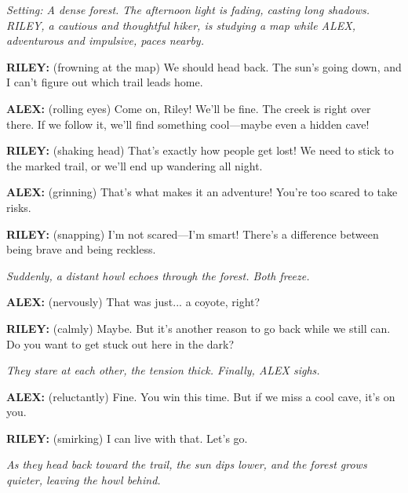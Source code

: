 \documentclass[12pt]{article}
\begin{document}
\begin{tcolorbox}[colframe=black!60, colback=white, 
coltitle=black, colbacktitle=black!15, fonttitle=\bfseries\Large, 
title=Text: The Lost Trail, halign title=center, left=10pt, right=10pt, top=10pt, bottom=15pt]


\textit{Setting: A dense forest. The afternoon light is fading, casting long shadows. RILEY, a cautious and thoughtful hiker, is studying a map while ALEX, adventurous and impulsive, paces nearby.}

\textbf{RILEY:} (frowning at the map) We should head back. The sun’s going down, and I can’t figure out which trail leads home.

\textbf{ALEX:} (rolling eyes) Come on, Riley! We’ll be fine. The creek is right over there. If we follow it, we’ll find something cool—maybe even a hidden cave!

\textbf{RILEY:} (shaking head) That’s exactly how people get lost! We need to stick to the marked trail, or we’ll end up wandering all night.

\textbf{ALEX:} (grinning) That’s what makes it an adventure! You’re too scared to take risks.

\textbf{RILEY:} (snapping) I’m not scared—I’m smart! There’s a difference between being brave and being reckless.

\textit{Suddenly, a distant howl echoes through the forest. Both freeze.}

\textbf{ALEX:} (nervously) That was just... a coyote, right?

\textbf{RILEY:} (calmly) Maybe. But it’s another reason to go back while we still can. Do you want to get stuck out here in the dark?

\textit{They stare at each other, the tension thick. Finally, ALEX sighs.}

\textbf{ALEX:} (reluctantly) Fine. You win this time. But if we miss a cool cave, it’s on you.

\textbf{RILEY:} (smirking) I can live with that. Let’s go.

\textit{As they head back toward the trail, the sun dips lower, and the forest grows quieter, leaving the howl behind.}

 
 

\end{tcolorbox}

\vspace{1em}
\end{document}
